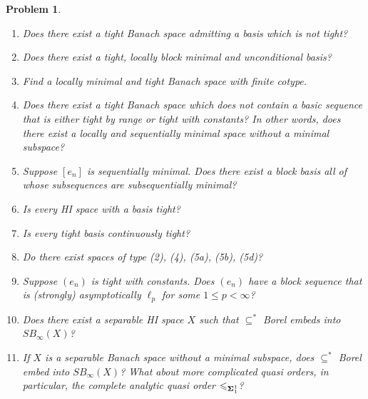 \documentclass[10pt]{amsart}
\numberwithin{equation}{section}
\newtheorem{prob}[thm]{Problem}
\begin{document}
\begin{prob}
\begin{enumerate}
 \item Does there exist a tight Banach space admitting a basis
  which is not tight?
 \item Does there exist a tight, locally block minimal and unconditional
 basis?
\item Find a locally minimal and tight Banach space with finite
  cotype.
\item Does there exist a tight Banach space which does not  contain a basic
  sequence that is either tight by range or tight with constants? In other
  words, does there exist a locally and sequentially minimal space without a
  minimal subspace?
\item Suppose $[e_n]$ is sequentially minimal. Does there exist a block basis all of whose subsequences are subsequentially minimal?
\item Is every HI space with a basis tight?
\item Is every tight basis continuously tight?
\item Do there exist spaces of type (2), (4), (5a), (5b), (5d)?
\item Suppose $(e_n)$ is tight with constants. Does $(e_n)$ have a block sequence
that is (strongly) asymptotically $\ell_p$ for some $1{\ensuremath{\leqslant}} p< \infty$?

\item Does there exist a separable HI space $X$ such that $\subseteq^*$ Borel embeds into $SB_\infty(X)$?
\item If $X$ is a separable Banach space without a minimal subspace, does
$\subseteq^*$ Borel embed into $SB_\infty(X)$? What about more complicated
quasi orders, in particular, the complete analytic quasi order ${\ensuremath{\leqslant}}_{{\bf
\Sigma}_1^1}$?

\end{enumerate}
\end{prob}
\end{document}
